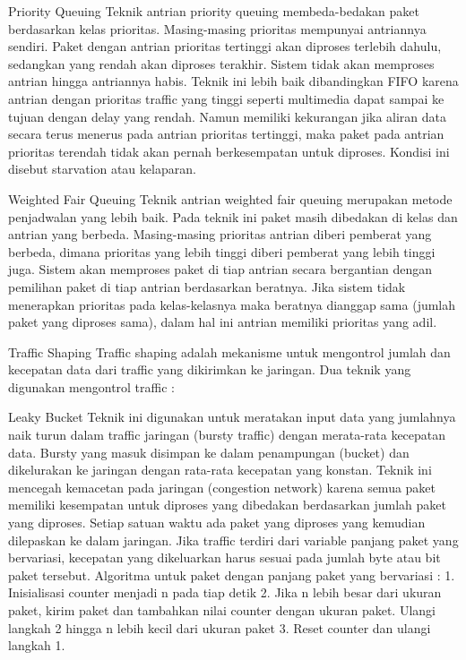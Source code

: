 \documentclass{jtetiproposalskripsi}
\begin{document}
Priority Queuing
Teknik antrian priority queuing membeda-bedakan paket berdasarkan kelas prioritas. Masing-masing prioritas mempunyai antriannya sendiri. Paket dengan antrian prioritas tertinggi akan diproses terlebih dahulu, sedangkan yang rendah akan diproses terakhir. Sistem tidak akan memproses antrian hingga antriannya habis. Teknik ini lebih baik dibandingkan FIFO karena antrian dengan prioritas traffic yang tinggi seperti multimedia dapat sampai ke tujuan dengan delay yang rendah. Namun memiliki kekurangan jika aliran data secara terus menerus pada antrian prioritas tertinggi, maka paket pada antrian prioritas terendah tidak akan pernah berkesempatan untuk diproses. Kondisi ini disebut starvation atau kelaparan.
 
Weighted Fair Queuing
Teknik antrian weighted fair queuing merupakan metode penjadwalan yang lebih baik. Pada teknik ini paket masih dibedakan di kelas dan antrian yang berbeda. Masing-masing prioritas antrian diberi pemberat yang berbeda, dimana prioritas yang lebih tinggi diberi pemberat yang lebih tinggi juga. Sistem akan memproses paket di tiap antrian secara bergantian dengan pemilihan paket di tiap antrian
berdasarkan beratnya. Jika sistem tidak menerapkan prioritas pada kelas-kelasnya maka beratnya dianggap sama (jumlah paket yang diproses sama), dalam hal ini antrian memiliki prioritas yang adil.

Traffic Shaping
Traffic shaping adalah mekanisme untuk mengontrol jumlah dan kecepatan data dari traffic yang dikirimkan ke jaringan. Dua teknik yang digunakan mengontrol traffic :
 
Leaky Bucket
Teknik ini digunakan untuk meratakan input data yang jumlahnya naik turun dalam traffic jaringan (bursty traffic) dengan merata-rata kecepatan data. Bursty yang masuk disimpan ke dalam penampungan (bucket) dan dikelurakan ke jaringan dengan rata-rata kecepatan yang konstan. Teknik ini mencegah kemacetan pada jaringan (congestion network) karena semua paket memiliki kesempatan untuk diproses yang dibedakan berdasarkan jumlah paket yang diproses. Setiap satuan waktu ada paket yang diproses yang kemudian dilepaskan ke dalam jaringan. Jika traffic terdiri dari variable panjang paket yang bervariasi, kecepatan yang dikeluarkan harus sesuai pada jumlah byte atau bit paket tersebut. Algoritma untuk paket dengan panjang paket yang bervariasi :
1. Inisialisasi counter menjadi n pada tiap detik
2. Jika n lebih besar dari ukuran paket, kirim paket dan tambahkan nilai counter dengan ukuran paket. Ulangi langkah 2 hingga n lebih kecil dari ukuran paket
3. Reset counter dan ulangi langkah 1.
\end{document}
